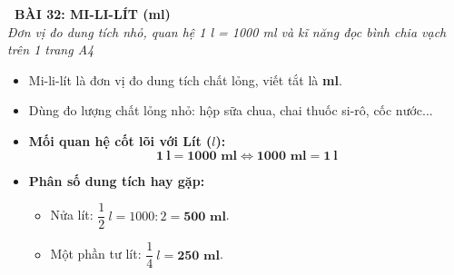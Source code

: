 \documentclass[11pt,a4paper]{article}
\begin{document}
\begin{tcolorbox}[
  enhanced,
  colback=white,
  colframe=primary,
  arc=3mm,
  boxrule=1.2pt,
  left=4mm, right=4mm, top=2.5mm, bottom=2.5mm,
  drop shadow=black!10!white
]
  \centering
  {\Large\bfseries\color{primary}\faBookmark\ BÀI 32: MI-LI-LÍT (ml)}\\[1.5mm]
  {\small\itshape\color{black!75}Đơn vị đo dung tích nhỏ, quan hệ 1 l = 1000 ml và kĩ năng đọc bình chia vạch trên 1 trang A4}
\end{tcolorbox}

\vspace{-2mm}


\noindent
\begin{minipage}[t]{0.49\textwidth}\vspace{0pt}
\begin{tcolorbox}[
  enhanced,
  colback=blue!4!white,
  colframe=blue!75!black,
  arc=2mm, boxrule=0.8pt,
  left=2mm, right=2mm, top=1.8mm, bottom=1.8mm,
  title={\footnotesize\bfseries\color{white}\faKey\ 1. Đơn vị Mi-li-lít (ml)}
]
{\footnotesize
\begin{itemize}\setlength{\itemsep}{1.5pt}\setlength{\leftskip}{-2.5mm}
  \item Mi-li-lít là đơn vị đo dung tích chất lỏng, viết tắt là \textbf{ml}.
  \item Dùng đo lượng chất lỏng nhỏ: hộp sữa chua, chai thuốc si-rô, cốc nước...
  \item \textbf{Mối quan hệ cốt lõi với Lít ($l$):}
  $$\mathbf{1\ l = 1000\text{ ml}} \iff \mathbf{1000\text{ ml} = 1\ l}$$
  \item \textbf{Phân số dung tích hay gặp:}
  \begin{itemize}\setlength{\itemsep}{0.5pt}\setlength{\leftskip}{-2.5mm}
    \item Nửa lít: $\dfrac{1}{2}\ l = 1000 : 2 = \mathbf{500\text{ ml}}$.
    \item Một phần tư lít: $\dfrac{1}{4}\ l = \mathbf{250\text{ ml}}$.
  \end{itemize}
\end{itemize}
}
\end{tcolorbox}
\end{minipage}
\hfill
\end{document}
